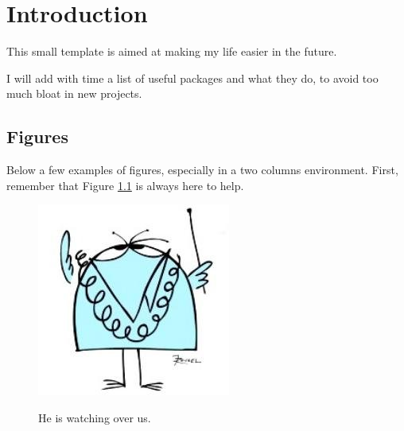 \chapter{Introduction}
    This small template is aimed at making my life easier in the future.

    I will add with time a list of useful packages and what they do, to avoid too much bloat in new projects.

    \section{Figures}
        Below a few examples of figures, especially in a two columns environment.
        First, remember that Figure \ref{fig:intro:shadoko} is always here to help.

        \begin{figure}[h]
            \centering
            \includegraphics[width=0.8\columnwidth]{figure/intro/shadoko}
            \label{fig:intro:shadoko}
            \caption{He is watching over us.\cite{denis2012de}}
        \end{figure}



